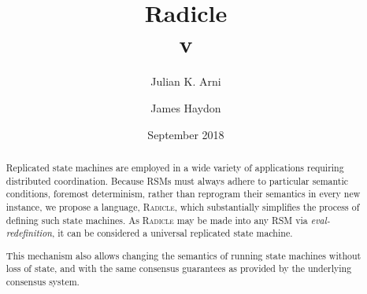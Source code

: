 \documentclass[a4paper, 9pt, draft]{amsart}
\title[Radicle]{Radicle \\ {\tiny v\Small1.0}}
\author{\Small Julian K. Arni}
\author{\Small James Haydon}
\date{September 2018}
\newcommand{\rads}{\textsc{\footnotesize{Radicle}}}
\begin{document}
\begin{abstract}
    Replicated state machines are employed in a wide variety of applications
    requiring distributed coordination. Because RSMs must always adhere to
    particular semantic conditions, foremost determinism, rather than reprogram
    their semantics in every new instance, we propose a language, \rads{}, which
    substantially simplifies the process of defining such state machines. As
    \rads{} may be made into any RSM via \emph{eval-redefinition}, it can be
    considered a universal replicated state machine.

    This mechanism also allows changing the semantics of running state machines
    without loss of state, and with the same consensus guarantees as provided
    by the underlying consensus system.
\end{abstract}
\maketitle

\setlength{\columnsep}{20pt}
\begin{multicols}{2}







\end{multicols}

\appendix



\end{document}
